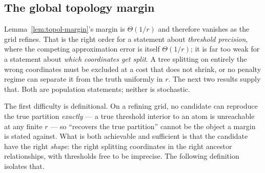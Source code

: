 \documentclass[11pt]{article}
\theoremstyle{plain}
\theoremstyle{definition}
\theoremstyle{remark}
\begin{document}
\subsection{The global topology margin}\label{sec:topology-global}

Lemma~\ref{lem:topol-margin}'s margin is \(\Theta(1/r)\) and therefore
vanishes as the grid refines. That is the right order for a statement about
\emph{threshold precision}, where the competing approximation error is itself
\(\Theta(1/r)\); it is far too weak for a statement about \emph{which
coordinates get split}. A tree splitting on entirely the wrong coordinates
must be excluded at a cost that does not shrink, or no penalty regime can
separate it from the truth uniformly in \(r\). The next two results supply
that. Both are population statements; neither is stochastic.

The first difficulty is definitional. On a refining grid, no candidate can
reproduce the true partition \emph{exactly} --- a true threshold interior to
an atom is unreachable at any finite \(r\) --- so ``recovers the true
partition'' cannot be the object a margin is stated against. What is both
achievable and sufficient is that the candidate have the right \emph{shape}:
the right splitting coordinates in the right ancestor relationships, with
thresholds free to be imprecise. The following definition isolates that.
\end{document}
